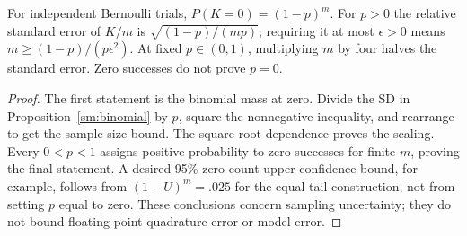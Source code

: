 \begin{corollary}
\label{sm:rare}
For independent Bernoulli trials, \(P(K=0)=(1-p)^m\). For \(p>0\) the
relative standard error of \(K/m\) is \(\sqrt{(1-p)/(mp)}\); requiring
it at most \(\epsilon>0\) means \(m\geq(1-p)/(p\epsilon^2)\).
At fixed \(p\in(0,1)\), multiplying \(m\) by four halves the standard
error. Zero successes do not prove \(p=0\).
\end{corollary}
\begin{proof}
The first statement is the binomial mass at zero. Divide the SD in
Proposition~\ref{sm:binomial} by \(p\), square the nonnegative inequality,
and rearrange to get the sample-size bound. The square-root dependence
proves the scaling. Every \(0<p<1\) assigns positive probability to
zero successes for finite \(m\), proving the final statement. A desired
95\% zero-count upper confidence bound, for example, follows from
\((1-U)^m=.025\) for the equal-tail construction, not from setting
\(p\) equal to zero. These conclusions concern sampling uncertainty;
they do not bound floating-point quadrature error or model error.
\end{proof}
